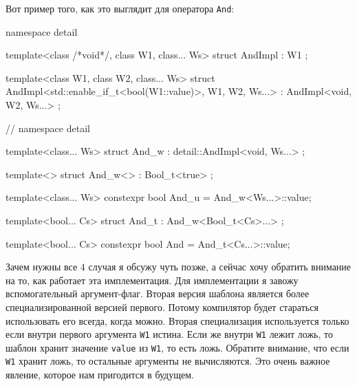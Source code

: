 Вот пример того, как это выглядит для оператора \verb"And":
\begin{cppcode}
namespace detail {
template<class /*void*/, class W1, class... Ws>
struct AndImpl : W1 {};

template<class W1, class W2, class... Ws>
struct AndImpl<std::enable_if_t<bool(W1::value)>, W1, W2, Ws...>
    : AndImpl<void, W2, Ws...> {};
} // namespace detail

template<class... Ws>
struct And_w : detail::AndImpl<void, Ws...> {};

template<>
struct And_w<> : Bool_t<true> {};

template<class... Ws>
constexpr bool And_u = And_w<Ws...>::value;

template<bool... Cs>
struct And_t : And_w<Bool_t<Cs>...> {};

template<bool... Cs>
constexpr bool And = And_t<Cs...>::value;
\end{cppcode}
Зачем нужны все $4$ случая я обсужу чуть позже, а сейчас хочу обратить внимание на то, как работает эта имплементация.
Для имплементации я завожу вспомогательный аргумент-флаг.
Вторая версия шаблона является более специализированной версией первого.
Потому компилятор будет стараться использовать его всегда, когда можно.
Вторая специализация используется только если внутри первого аргумента \verb"W1" истина.
Если же внутри \verb"W1" лежит ложь, то шаблон хранит значение \verb"value" из \verb"W1", то есть ложь.
Обратите внимание, что если \verb"W1" хранит ложь, то остальные аргументы не вычисляются.
Это очень важное явление, которое нам пригодится в будущем.

